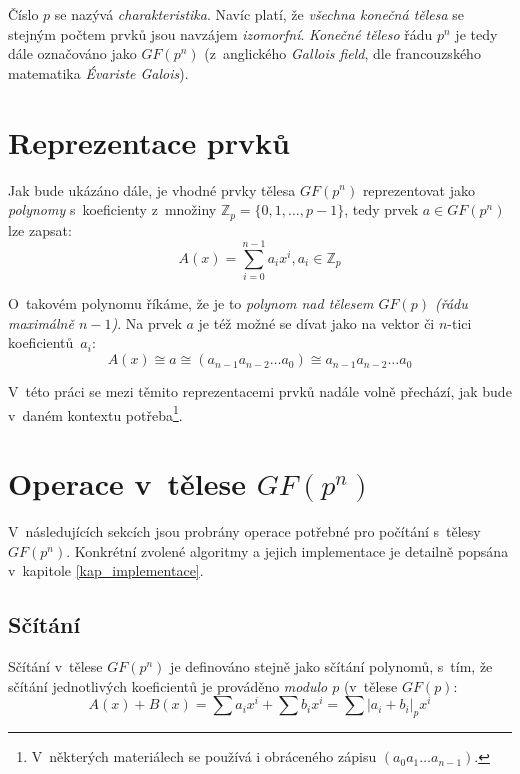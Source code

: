 \documentclass[thesis=M,czech,hidelinks]{FITthesis}[2012/06/26]
\newcommand{\0}{{\textcolor[gray]{0.80}{0}}}
\begin{document}
Číslo $p$ se nazývá \emph{charakteristika}. Navíc platí, že \emph{všechna
konečná tělesa} se stejným počtem prvků jsou navzájem \emph{izomorfní}.
\emph{Konečné těleso} řádu $p^n$ je tedy dále označováno jako $GF(p^n)$
(z~anglického \emph{Gallois field}, dle francouzského matematika \emph{Évariste
Galois}).

\section{Reprezentace prvků}

Jak bude ukázáno dále, je vhodné prvky tělesa $GF(p^n)$ reprezentovat jako
\emph{polynomy} s~koeficienty z~množiny $\mathbb{Z}_p=\{0,1,\ldots,p-1\}$, tedy
prvek $a \in GF(p^n)$ lze zapsat:
$$ A(x) = \sum_{i=0}^{n-1} a_i x^i, a_i \in \mathbb{Z}_p $$

O~takovém polynomu říkáme, že je to \emph{polynom nad tělesem $GF(p)$ (řádu
maximálně $n-1$)}. Na prvek $a$ je též možné se dívat jako na vektor či $n$-tici
koeficientů~$a_i$:
$$
    A(x) \cong a \cong (a_{n-1} a_{n-2} \ldots a_0) \cong
    a_{n-1} a_{n-2} \ldots a_0
$$

V~této práci se mezi těmito reprezentacemi prvků nadále volně přechází, jak bude
v~daném kontextu potřeba\footnote{
    V~některých materiálech se používá i obráceného zápisu
    $(a_0 a_1 \ldots a_{n-1})$.
}.

\section{Operace v~tělese $GF(p^n)$}

V~následujících sekcích jsou probrány operace potřebné pro počítání s~tělesy
$GF(p^n)$. Konkrétní zvolené algoritmy a jejich implementace je detailně popsána
v~kapitole \ref{kap_implementace}.

\subsection{Sčítání}

Sčítání v~tělese $GF(p^n)$ je definováno stejně jako sčítání polynomů, s~tím, že
sčítání jednotlivých koeficientů je prováděno \emph{modulo $p$} (v~tělese
$GF(p)$:
$$
    A(x) + B(x) = \sum a_i x^i + \sum b_i x^i =
    \sum \left|a_i + b_i\right|_p x^i
$$
\end{document}
